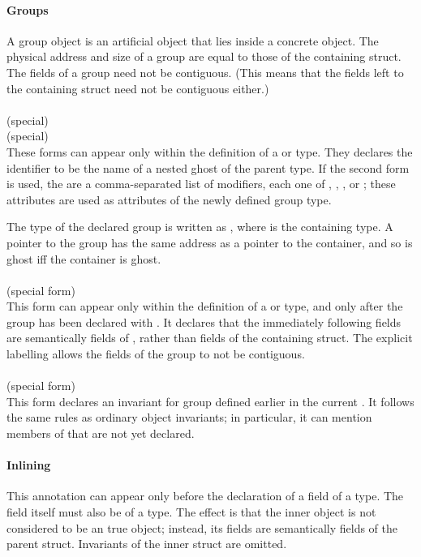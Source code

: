 \documentclass[preprint,nocopyrightspace]{sigplanconf}
\newcommand{\subsubsubsection}[1]{\paragraph{#1}}
\begin{document}
{{{\subsubsubsection{Groups}
A group object is an artificial object that lies inside a
concrete  object. The physical address and size of a group
are equal to those of the containing struct. The fields of a group
need not be contiguous. (This means that the fields left to the
containing struct need not be contiguous either.)
\\\\
\noindent{} (special)\\
 (special)\\
These forms can appear only within the definition of a 
or  type. They declares the identifier  to be the name of a nested
ghost  of the parent type. If the second form is used,
the  are a comma-separated list of modifiers,
each one of , , ,
or ; these attributes are used as attributes of the
newly defined group type.

The type of the declared group is written as , where 
is the containing  type. A pointer to the group has the
same address as a pointer to the container, and so is ghost iff the
container is ghost. 
\\\\
 (special form)\\
This form can appear only within the definition of a 
or  type, and only after the group  has been
declared with . It declares that the immediately
following fields are semantically fields of , rather than fields of
the containing struct. The explicit labelling allows the fields of the
group to not be contiguous.
\\\\
 (special form)\\
This form declares an invariant for group  defined earlier in
the current . It follows the same rules as ordinary object
invariants; in particular, it can mention members of  that are
not yet declared.

\subsubsubsection{Inlining}

This annotation can appear only before the declaration of a field of
a  type. The field itself must also be of a 
type. The effect is that the inner object is not considered to be an
true object; instead, its fields are semantically fields of the
parent struct. Invariants of the inner struct are omitted.

}}}
\end{document}
